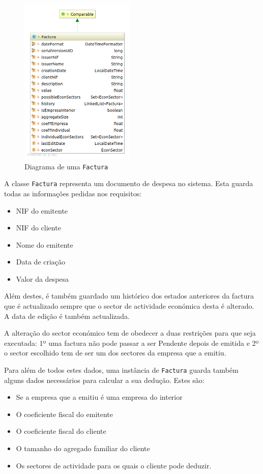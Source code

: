 \documentclass[12pt,a4paper]{report}
\begin{document}
    \begin{figure}
        \includegraphics[width=5.5cm]{./images/Factura.png}
        \caption{Diagrama de uma \texttt{Factura}}\label{fig:Factura}
    \end{figure}

    A classe \texttt{Factura} representa um documento de despesa no
    sistema. Esta guarda todas as informações pedidas nos requisitos:
    \begin{multicols}{2}
        \begin{itemize}
            \item NIF do emitente
            \item NIF do cliente
            \item Nome do emitente
            \item Data de criação
            \item Valor da despesa
        \end{itemize}
    \end{multicols}
    Além destes, é também guardado um histórico dos estados anteriores da factura
    que é actualizado sempre que o sector de actividade económica desta é
    alterado. A data de edição é também actualizada.

    A alteração do sector económico tem de obedecer a duas restrições para que
    seja executada: 1º uma factura não pode passar a ser Pendente depois de
    emitida e 2º o sector escolhido tem de ser um dos sectores da empresa que a
    emitiu.

    Para além de todos estes dados, uma instância de \texttt{Factura}
    guarda também alguns dados necessários para calcular a sua dedução. Estes são:
    \begin{itemize}
        \item Se a empresa que a emitiu é uma empresa do interior
        \item O coeficiente fiscal do emitente
        \item O coeficiente fiscal do cliente
        \item O tamanho do agregado familiar do cliente
        \item Os sectores de actividade para os quais o cliente
            pode deduzir.
    \end{itemize}
\end{document}
